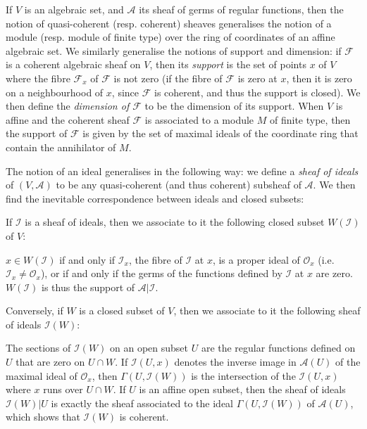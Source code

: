 \documentclass{article}
\theoremstyle{plain}
\newcommand{\scr}[1]{{\mathscr{#1}}}
\newcommand{\oldpage}[1]{\marginpar{\footnotesize$\Big\vert$ \textit{p.~#1}}}
\begin{document}
If $V$ is an algebraic set, and $\scr{A}$ its sheaf of germs of regular functions, then the notion of quasi-coherent (resp. coherent) sheaves generalises the notion of a module (resp. module of finite type) over the ring of coordinates of an affine algebraic set.
We similarly generalise the notions of support and dimension: if $\scr{F}$ is a coherent algebraic sheaf on $V$, then its \emph{support} is the set of points $x$ of $V$ where the fibre $\scr{F}_x$ of $\scr{F}$ is not zero (if the fibre of $\scr{F}$ is zero at $x$, then it is zero on a neighbourhood of $x$, since $\scr{F}$ is coherent, and thus the support is closed).
We then define the \emph{dimension of $\scr{F}$} to be the dimension of its support.
When $V$ is affine and the coherent sheaf $\scr{F}$ is associated to a module $M$ of finite type, then the support of $\scr{F}$ is given by the set of maximal ideals of the coordinate ring that contain the annihilator of $M$.

The notion of an ideal generalises in the following way: we define a \emph{sheaf of ideals} of $(V,\scr{A})$ to be any quasi-coherent (and thus coherent) subsheaf of $\scr{A}$.
We then find the inevitable correspondence between ideals and closed subsets:

If $\scr{I}$ is a sheaf of ideals, then we associate to it the following closed subset $W(\scr{I})$ of $V$:

$x\in W(\scr{I})$ if and only if $\scr{I}_x$, the fibre of $\scr{I}$ at $x$, is a proper ideal of $\scr{O}_x$ (i.e. $\scr{I}_x\neq\scr{O}_x$), or if and only if the germs of the functions defined by $\scr{I}$ at $x$ are zero.
$W(\scr{I})$ is thus the support of $\scr{A}|\scr{I}$.

Conversely, if $W$ is a closed subset of $V$, then we associate to it the following sheaf of ideals $\scr{I}(W)$:

The sections of $\scr{I}(W)$ on an open subset $U$ are the regular functions defined on $U$ that are zero on $U\cap W$.
If $\scr{I}(U,x)$ denotes the inverse image in $\scr{A}(U)$ of the maximal ideal of $\scr{O}_x$, then $\Gamma(U,\scr{I}(W))$ is the intersection
\oldpage{2-03}
of the $\scr{I}(U,x)$ where $x$ runs over $U\cap W$.
If $U$ is an affine open subset, then the sheaf of ideals $\scr{I}(W)|U$ is exactly the sheaf associated to the ideal $\Gamma(U,\scr{I}(W))$ of $\scr{A}(U)$, which shows that $\scr{I}(W)$ is coherent.
\end{document}
